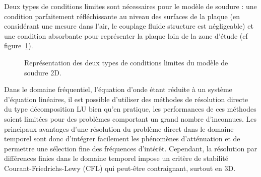 Deux types de conditions limites sont nécessaires pour le modèle de soudure : une condition parfaitement réfléchissante au niveau des surfaces de la plaque (en considérant une mesure dans l'air, le couplage fluide structure est négligeable) et une condition absorbante pour représenter la plaque loin de la zone d'étude (cf figure~\ref{BC}).

\begin{figure}[!h]
	\centering
	\caption{Représentation des deux types de conditions limites du modèle de soudure 2D.\label{BC}}
\end{figure}


Dans le domaine fréquentiel, l'équation d'onde étant réduite à un système d'équation linéaires, il est possible d'utiliser des méthodes de résolution directe du type décomposition LU bien qu'en pratique, les performances de ces méthodes soient limitées pour des problèmes comportant un grand nombre d'inconnues.  Les principaux avantages d'une résolution du problème direct dans le domaine temporel sont donc d'intégrer facilement les phénomènes d'atténuation et de permettre une sélection fine des fréquences d'intérêt. Cependant, la résolution par différences finies dans le domaine temporel impose un critère de stabilité Courant-Friedrichs-Lewy (CFL) qui peut-être contraignant, surtout en 3D.





